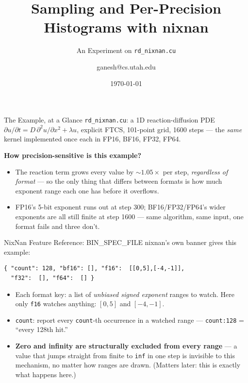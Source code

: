 \documentclass{beamer}
\title{Sampling and Per-Precision Histograms with nixnan}
\subtitle{An Experiment on \texttt{rd\_nixnan.cu}}
\author{ganesh@cs.utah.edu}
\date{\today}
\begin{document}
\frame{\titlepage}

\begin{frame}{The Example, at a Glance}
\texttt{rd\_nixnan.cu}: a 1D reaction-diffusion PDE
$\partial u/\partial t = D\,\partial^2 u/\partial x^2 + \lambda u$,
explicit FTCS, 101-point grid, 1600 steps --- the \emph{same} kernel
implemented once each in FP16, BF16, FP32, FP64.

\vspace{0.5cm}
\textbf{How precision-sensitive is this example?}
\begin{itemize}
  \item The reaction term grows every value by ${\sim}1.05\times$ per step,
    \emph{regardless of format} --- so the only thing that differs between
    formats is how much exponent range each one has before it overflows.
  \item FP16's 5-bit exponent runs out at step 300; BF16/FP32/FP64's
    wider exponents are all still finite at step 1600 --- same algorithm,
    same input, one format fails and three don't.
\end{itemize}
\end{frame}

\begin{frame}[fragile]{NixNan Feature Reference: BIN\_SPEC\_FILE}
nixnan's own banner gives this example:
\begin{lstlisting}
{ "count": 128, "bf16": [], "f16":  [[0,5],[-4,-1]],
  "f32":  [], "f64":  [] }
\end{lstlisting}
\begin{itemize}
  \item Each format key: a list of \emph{unbiased signed exponent} ranges to
    watch. Here only \texttt{f16} watches anything: $[0,5]$ and $[-4,-1]$.
  \item \texttt{count}: report every \texttt{count}-th occurrence in a
    watched range --- \texttt{count:128} = ``every 128th hit.''
  \item \textbf{Zero and infinity are structurally excluded from every
    range} --- a value that jumps straight from finite to \texttt{inf} in
    one step is invisible to this mechanism, no matter how ranges are
    drawn. (Matters later: this is exactly what happens here.)
\end{itemize}
\end{frame}
\end{document}
